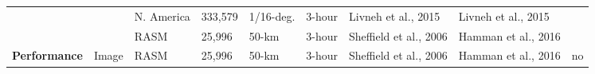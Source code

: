 \documentclass[gmd, manuscript]{copernicus}
\begin{document}
\begin{table}[]
{\begin{tabular}{|l|l|l|l|l|l|l|l|l|}
                                  &                              & N. America      & 333,579             & 1/16-deg.           & 3-hour            & Livneh et al., 2015    & Livneh et al., 2015 &                     \\ \cline{3-8}
                                  &                              & RASM            & 25,996              & 50-km               & 3-hour            & Sheffield et al., 2006 & Hamman et al., 2016 &                     \\ \hline
\textbf{Performance}              & Image                        & RASM            & 25,996              & 50-km               & 3-hour            & Sheffield et al., 2006 & Hamman et al., 2016 & no                  \\ \hline
\end{tabular}
}
\end{table}
\end{document}
